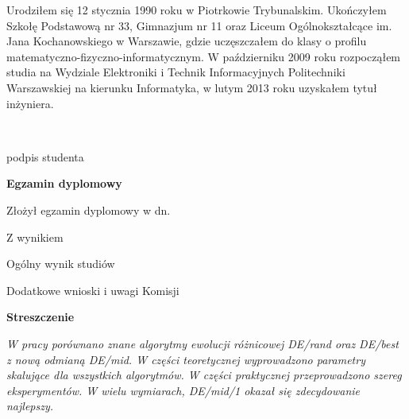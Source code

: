 \begin{titlepage}
    \indent
Urodziłem się 12 stycznia 1990 roku w Piotrkowie Trybunalskim. Ukończyłem Szkołę Podstawową
nr 33, Gimnazjum nr 11 oraz Liceum Ogólnokształcące im. Jana Kochanowskiego w Warszawie, gdzie
uczęszczałem do klasy o profilu matematyczno-fizyczno-informatycznym.
W październiku 2009 roku rozpocząłem studia na Wydziale Elektroniki i Technik Informacyjnych
Politechniki Warszawskiej na kierunku Informatyka, w lutym 2013 roku uzyskałem
tytuł inżyniera.

    \par
    \vspace{2\baselineskip}
    \hfill\parbox{15em}{{\small\dotfill}\\[-.3ex]
    \centerline{\footnotesize podpis studenta}}\par
    \vspace{3\baselineskip}
    \begin{center}
 	{\large\bfseries Egzamin dyplomowy} \par\bigskip\bigskip
    \end{center}
    \par\noindent\vspace{1.5\baselineskip}
    Złożył egzamin dyplomowy w dn. \dotfill
    \par\noindent\vspace{1.5\baselineskip}
    Z wynikiem \dotfill
    \par\noindent\vspace{1.5\baselineskip}
    Ogólny wynik studiów \dotfill
    \par\noindent\vspace{1.5\baselineskip}
    Dodatkowe wnioski i uwagi Komisji \dotfill
    \par\noindent\vspace{1.5\baselineskip}
    \dotfill

    \newpage\thispagestyle{empty}
    \vspace*{2\baselineskip}
    \begin{center}
	{\large\bfseries Streszczenie}\par\bigskip
    \end{center}

    {\itshape
W pracy porównano znane algorytmy ewolucji różnicowej DE/rand oraz DE/best z nową odmianą DE/mid.
W części teoretycznej wyprowadzono parametry skalujące dla wszystkich algorytmów. W części praktycznej
przeprowadzono szereg eksperymentów. W wielu wymiarach,
DE/mid/1 okazał się zdecydowanie najlepszy.}
    \vspace*{1\baselineskip}


\end{titlepage}
